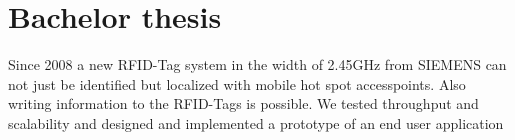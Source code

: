 \section{Bachelor thesis}
{\small Since 2008 a new RFID-Tag system in the width of 2.45GHz from SIEMENS can not just be identified but 
localized with mobile hot spot accesspoints. Also writing information to the RFID-Tags is possible.
We tested throughput and scalability and designed and implemented a prototype of an end user application}

